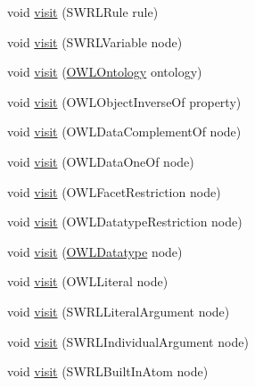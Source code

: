 \begin{DoxyCompactItemize}
void \hyperlink{classorg_1_1coode_1_1owlapi_1_1latex_1_1_latex_object_visitor_a6c3bfa50d1ed7575355c40aba1edbe34}{visit} (S\-W\-R\-L\-Rule rule)
\item 
void \hyperlink{classorg_1_1coode_1_1owlapi_1_1latex_1_1_latex_object_visitor_a3592475b9b7b4ac6fb1024357b1de18e}{visit} (S\-W\-R\-L\-Variable node)
\item 
void \hyperlink{classorg_1_1coode_1_1owlapi_1_1latex_1_1_latex_object_visitor_ac9e0c3ba31cd076ac8d5b218f75a2b82}{visit} (\hyperlink{interfaceorg_1_1semanticweb_1_1owlapi_1_1model_1_1_o_w_l_ontology}{O\-W\-L\-Ontology} ontology)
\item 
void \hyperlink{classorg_1_1coode_1_1owlapi_1_1latex_1_1_latex_object_visitor_a2cf77b2e6a24d65491c2e034ee03246a}{visit} (O\-W\-L\-Object\-Inverse\-Of property)
\item 
void \hyperlink{classorg_1_1coode_1_1owlapi_1_1latex_1_1_latex_object_visitor_afb7c44009522cd457a1fe544bd4d2785}{visit} (O\-W\-L\-Data\-Complement\-Of node)
\item 
void \hyperlink{classorg_1_1coode_1_1owlapi_1_1latex_1_1_latex_object_visitor_afa399d071e14e3316ceefce29e24e2ce}{visit} (O\-W\-L\-Data\-One\-Of node)
\item 
void \hyperlink{classorg_1_1coode_1_1owlapi_1_1latex_1_1_latex_object_visitor_ac35761087dd4934c917665624e667daa}{visit} (O\-W\-L\-Facet\-Restriction node)
\item 
void \hyperlink{classorg_1_1coode_1_1owlapi_1_1latex_1_1_latex_object_visitor_a7bd789f6093cc57fd3b6872903804209}{visit} (O\-W\-L\-Datatype\-Restriction node)
\item 
void \hyperlink{classorg_1_1coode_1_1owlapi_1_1latex_1_1_latex_object_visitor_a3fb79c45b5e743a22cd1dcf41c948acf}{visit} (\hyperlink{interfaceorg_1_1semanticweb_1_1owlapi_1_1model_1_1_o_w_l_datatype}{O\-W\-L\-Datatype} node)
\item 
void \hyperlink{classorg_1_1coode_1_1owlapi_1_1latex_1_1_latex_object_visitor_a5bedda4949aefe3d536f74ce67b8c373}{visit} (O\-W\-L\-Literal node)
\item 
void \hyperlink{classorg_1_1coode_1_1owlapi_1_1latex_1_1_latex_object_visitor_a25ae378bdeb5200246a72e5bbe410601}{visit} (S\-W\-R\-L\-Literal\-Argument node)
\item 
void \hyperlink{classorg_1_1coode_1_1owlapi_1_1latex_1_1_latex_object_visitor_a61cf71fe8b3dfd1ba0953f5e05cb9ca0}{visit} (S\-W\-R\-L\-Individual\-Argument node)
\item 
void \hyperlink{classorg_1_1coode_1_1owlapi_1_1latex_1_1_latex_object_visitor_ac2c1fa6615c47b19e76ca418012322c2}{visit} (S\-W\-R\-L\-Built\-In\-Atom node)

\end{DoxyCompactItemize}
